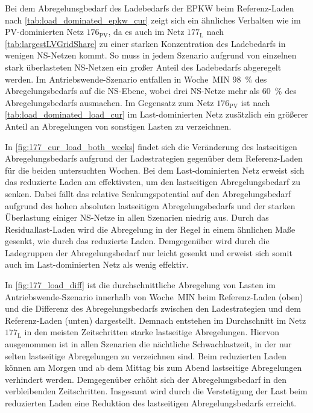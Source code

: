 



Bei dem Abregelunsgbedarf des Ladebedarfs der \gls{EPKW} beim Referenz-Laden nach \autoref{tab:load_dominated_epkw_cur} zeigt sich ein ähnliches Verhalten wie im \gls{PV}-dominierten Netz \(176_{\text{PV}}\), da es auch im Netz \(177_{\text{L}}\) nach \autoref{tab:largestLVGridShare} zu einer starken Konzentration des Ladebedarfs in wenigen \gls{NS}-Netzen kommt.
So muss in jedem Szenario aufgrund von einzelnen stark überlasteten \gls{NS}-Netzen ein großer Anteil des Ladebedarfs abgeregelt werden.
Im Antriebswende-Szenario entfallen in Woche~MIN \SI{98}{\percent} des Abregelungsbedarfs auf die \gls{NS}-Ebene, wobei drei \gls{NS}-Netze mehr als \SI{60}{\percent} des Abregelungsbedarfs ausmachen.
Im Gegensatz zum Netz \(176_{\text{PV}}\) ist nach \autoref{tab:load_dominated_load_cur} im Last-dominierten Netz zusätzlich ein größerer Anteil an Abregelungen von sonstigen Lasten zu verzeichnen.





In \autoref{fig:177_cur_load_both_weeks} findet sich die Veränderung des lastseitigen Abregelungsbedarfs aufgrund der Ladestrategien gegenüber dem Referenz-Laden für die beiden untersuchten Wochen.
Bei dem Last-dominierten Netz erweist sich das reduzierte Laden am effektivsten, um den lastseitigen Abregelungsbedarf zu senken.
Dabei fällt das relative Senkungspotential auf den Abregelungsbedarf aufgrund des hohen absoluten lastseitigen Abregelungsbedarfs und der starken Überlastung einiger \gls{NS}-Netze in allen Szenarien niedrig aus.
Durch das Residuallast-Laden wird die Abregelung in der Regel in einem ähnlichen Maße gesenkt, wie durch das reduzierte Laden.
Demgegenüber wird durch die Ladegruppen der Abregelungsbedarf nur leicht gesenkt und erweist sich somit auch im Last-dominierten Netz als wenig effektiv.



In \autoref{fig:177_load_diff} ist die durchschnittliche Abregelung von Lasten im Antriebswende-Szenario innerhalb von Woche~MIN beim Referenz-Laden (oben) und die Differenz des Abregelungsbedarfs zwischen den Ladestrategien und dem Referenz-Laden (unten) dargestellt.
Demnach entstehen im Durchschnitt im Netz \(177_{\text{L}}\) in den meisten Zeitschritten starke lastseitige Abregelungen.
Hiervon ausgenommen ist in allen Szenarien die nächtliche Schwachlastzeit, in der nur selten lastseitige Abregelungen zu verzeichnen sind.
Beim reduzierten Laden können am Morgen und ab dem Mittag bis zum Abend lastseitige Abregelungen verhindert werden.
Demgegenüber erhöht sich der Abregelungsbedarf in den verbleibenden Zeitschritten.
Insgesamt wird durch die Verstetigung der Last beim reduzierten Laden eine Reduktion des lastseitigen Abregelungsbedarfs erreicht.\medskip

